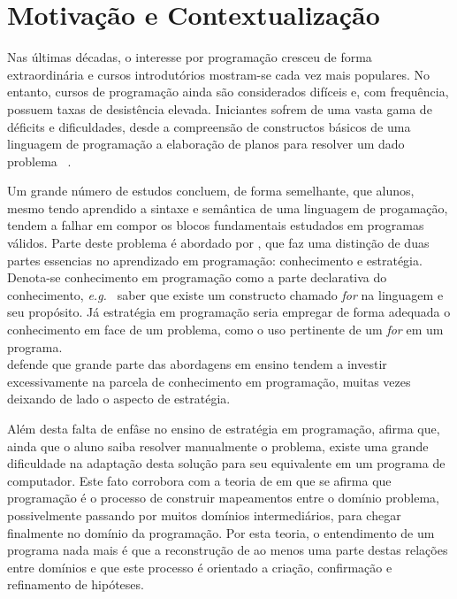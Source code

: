 \section{Motivação e Contextualização}
Nas últimas décadas, o interesse por programação cresceu de forma extraordinária 
e cursos introdutórios mostram-se cada vez mais populares. No entanto, 
cursos de programação ainda são considerados difíceis e, com frequência,
possuem taxas de desistência elevada. Iniciantes sofrem de uma 
vasta gama de déficits e dificuldades, desde a compreensão de constructos 
básicos de uma linguagem de programação a elaboração de planos
para resolver um dado problema \ \cite{robins2003learning}.

Um grande número de estudos concluem, de forma semelhante, que alunos, 
mesmo tendo aprendido a sintaxe e semântica de uma linguagem 
de progamação, tendem a falhar em compor os blocos fundamentais 
estudados em programas  válidos. Parte deste problema é abordado por 
, que faz uma distinção de duas partes 
essencias no aprendizado em programação: 
conhecimento e estratégia. Denota-se conhecimento em programação como a parte declarativa 
do conhecimento, \emph{e.g.\ } saber que existe um constructo chamado \emph{for} na linguagem 
e seu propósito. Já estratégia em programação seria empregar de forma adequada o conhecimento 
em face de um problema, como o uso pertinente de um \emph{for} em um programa.\\
 defende que grande parte das abordagens em ensino 
tendem a investir excessivamente na parcela de conhecimento em programação, muitas 
vezes deixando de lado o aspecto de estratégia.

Além desta falta de enfâse no ensino de estratégia em programação,
 afirma que, ainda que o aluno saiba resolver 
manualmente o problema,
existe uma grande dificuldade na adaptação 
desta solução para seu equivalente em um programa de computador. Este fato 
corrobora com a teoria de  em que se afirma que programação 
é o processo de construir mapeamentos entre o domínio problema, possivelmente passando 
por muitos domínios intermediários, para chegar finalmente no domínio da programação. 
Por esta teoria, o entendimento de um programa nada mais é que a reconstrução de 
ao menos uma parte destas relações entre domínios e que este processo é orientado 
a criação, confirmação e refinamento de hipóteses.

